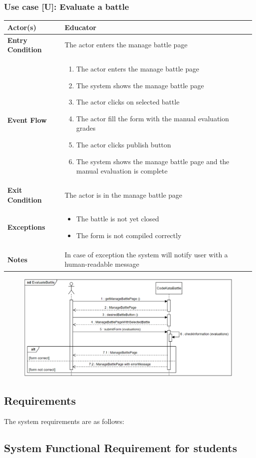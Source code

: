 \documentclass[12pt, a4paper]{report}
\newcounter{useCase}
\newcounter{Requirements}
\newcommand{\usecase}[9]{
    \def\arraystretch{1.5} 
    \subsubsection*{Use case [U#2]: #3}
    \vspace*{0.2cm}
    \begin{center}
        \begin{tabular}{|l|p{12cm}|}
            \hline
            \textbf{Actor(s)} & #4 \\
            \hline
            \textbf{Entry Condition} & #5 \\
            \hline
            \textbf{Event Flow} & #6 \\
            \hline
            \textbf{Exit Condition} & #7 \\
            \hline
            \textbf{Exceptions} & #8 \\
            \hline
            \textbf{Notes} & #9 \\
            \hline
        \end{tabular}
    \end{center}
    #1
}
\begin{document}
        \usecase{\begin{figure}[H]\centering\includegraphics[width=0.9\linewidth]{images/evaluatebattle.png}\end{figure}}        
        {\arabic{useCase}\stepcounter{useCase}}
        {Evaluate a battle}
        {Educator}
        {The actor enters the manage battle page}
        {
        \begin{enumerate}
            \item The actor enters the manage battle page
            \item The system shows the manage battle page
            \item The actor clicks on selected battle
            \item The actor fill the form with the manual evaluation grades
            \item The actor clicks publish button
            \item The system shows the manage battle page and the manual evaluation is complete
        \end{enumerate}
        }
        {The actor is in the manage battle page}
        {
        \begin{itemize}
            \item The battle is not yet closed
            \item The form is not compiled correctly
        \end{itemize}
        }
        {In case of exception the system will notify user with a human-readable message}

        \subsection{Requirements}
        The system requirements are as follows:
        \subsection{System Functional Requirement for students}
\end{document}
